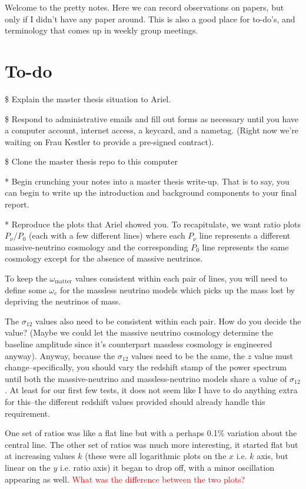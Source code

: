 \documentclass[11pt]{article}
\begin{document}
\fontsize{12}{15}

Welcome to the pretty notes. Here we can record observations on papers, but
only if I didn't have any paper around. This is also a good place for to-do's,
and terminology that comes up in weekly group meetings.

\section{To-do}

\$ Explain the master thesis situation to Ariel.

\$ Respond to administrative emails and fill out forms as necessary until you
have a computer account, internet access, a keycard, and a nametag. (Right now
we're waiting on Frau Kestler to provide a pre-signed contract).

\$ Clone the master thesis repo to this computer

* Begin crunching your notes
into a master thesis write-up. That is to say, you can begin to write up the
introduction and background components to your final report.

* Reproduce the plots that Ariel showed you. To recapitulate, we want ratio
plots $P_\nu / P_0$ (each with a few different lines) where each $P_\nu$ line
represents a different massive-neutrino cosmology and the corresponding $P_0$
line represents the same cosmology except for the absence of massive neutrinos.

To keep the $\omega_\text{matter}$ values consistent within each pair of lines,
you will need to define some $\omega_c$ for the massless neutrino models which
picks up the mass lost by depriving the neutrinos of mass.

The $\sigma_{12}$ values also need to be consistent within each pair. How do
you decide the value? (Maybe we could let the massive neutrino cosmology
determine the baseline amplitude since it's counterpart massless cosmology is
engineered anyway). Anyway, because the $\sigma_{12}$ values need to be the
same, the $z$ value must change--specifically, you should vary the redshift
stamp of the power spectrum until both the massive-neutrino and
massless-neutrino models share a value of $\sigma_{12}$. At least for our first
few tests, it does not seem like I have to do anything extra for this--the
different redshift values provided should already handle this requirement.

One set of ratios was like a flat line but with a perhaps 0.1\% variation about
the central line. The other set of ratios was much more interesting, it started
flat but at increasing values $k$ (these were all logarithmic plots on the $x$
i.e. $k$ axis, but linear on the $y$ i.e. ratio axis) it began to drop off,
with a minor oscillation appearing as well. \textcolor{red}{What was the
difference between the two plots?}
\end{document}
